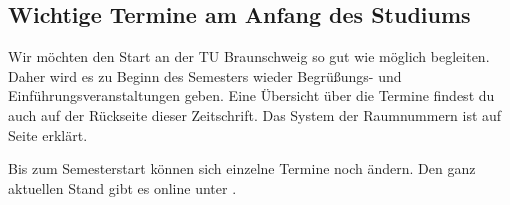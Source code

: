 
\subsection{Wichtige Termine am Anfang des Studiums}


Wir möchten den Start an der TU Braunschweig so gut wie möglich begleiten. Daher wird es zu Beginn des Semesters wieder Begrüßungs- und Einführungsveranstaltungen geben. Eine Übersicht über die Termine findest du auch auf der Rückseite dieser Zeitschrift. Das System der Raumnummern ist auf Seite \pageref{campuskarte} erklärt.

Bis zum Semesterstart können sich einzelne Termine noch ändern. Den ganz aktuellen Stand gibt es online unter .

\renewcommand{\labelitemi}{$\bullet$}
\renewcommand{\labelitemii}{$\bullet$}
\renewcommand{\labelitemiii}{$\bullet$}
\renewcommand{\labelitemiv}{$\bullet$}

